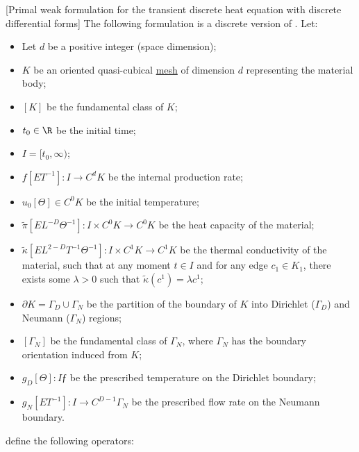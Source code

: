 \begin{formulation}
  \label{cmc/diffusion/discrete/transient/primal_weak-formulation}
  [Primal weak formulation for the transient discrete heat equation
    with discrete differential forms]
  The following formulation is a discrete version of
  .
  Let:
  \begin{itemize}
    \item
      Let $d$ be a positive integer (space dimension);
    \item
      $K$ be an oriented quasi-cubical \hyperref[cmc:mesh:definition]{mesh} of
      dimension $d$ representing the material body;
    \item
      $[K]$ be the fundamental class of $K$;
    \item
      $t_0 \in \R$ be the initial time;
    \item
      $I = [t_0, \infty)$;
    \item
      $f [E T^{-1}] \colon I \to C^d K$ be the internal production rate;
    \item
      $u_0 [\Theta] \in C^0 K$ be the initial temperature;
    \item
      $\tilde{\pi} [E L^{-D} \Theta^{-1}] \colon I \times C^0 K \to C^0 K$
      be the heat capacity of the material;
    \item
      $\tilde{\kappa} [E L^{2 - D} T^{-1} \Theta^{-1}]
      \colon I \times C^1 K \to C^1 K$
      be the thermal conductivity of the material, such that at any moment
      $t \in I$ and for any edge $c_1 \in K_1$, there exists some $\lambda > 0$
      such that $\tilde{\kappa}(c^1) = \lambda c^1$;
    \item
      $\partial K = \Gamma_D \cup \Gamma_N$ be the partition of the boundary of
      $K$ into Dirichlet ($\Gamma_D$) and Neumann ($\Gamma_N$) regions;
    \item
      $[\Gamma_N]$ be the fundamental class of $\Gamma_N$, where $\Gamma_N$
      has the boundary orientation induced from $K$;
    \item
      $g_D [\Theta] \colon I ƒ$
      be the prescribed temperature on the Dirichlet boundary;
    \item
      $g_N [E T^{-1}] \colon I \to C^{D - 1} \Gamma_N$
      be the prescribed flow rate on the Neumann boundary.
  \end{itemize}
  define the following operators:
  \begin{subequations}
    \begin{alignat}{3}

\end{alignat}
\end{subequations}
\end{formulation}
